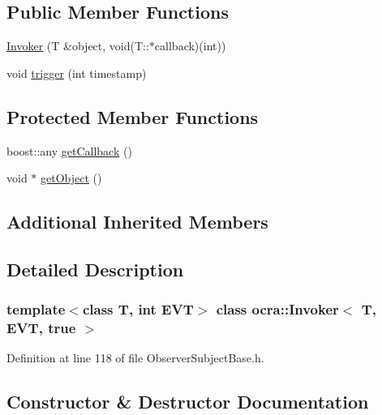 \subsection*{Public Member Functions}
\begin{DoxyCompactItemize}
\item 
\hyperlink{classocra_1_1Invoker_3_01T_00_01EVT_00_01true_01_4_afba0606d59375568cb88fe02023c962e}{Invoker} (T \&object, void(T\+::$\ast$callback)(int))
\item 
void \hyperlink{classocra_1_1Invoker_3_01T_00_01EVT_00_01true_01_4_a9b6283c07e6477a21c4b82b17940d832}{trigger} (int timestamp)
\end{DoxyCompactItemize}
\subsection*{Protected Member Functions}
\begin{DoxyCompactItemize}
\item 
boost\+::any \hyperlink{classocra_1_1Invoker_3_01T_00_01EVT_00_01true_01_4_a902cb0e1084dc60929920a56631c8586}{get\+Callback} ()
\item 
void $\ast$ \hyperlink{classocra_1_1Invoker_3_01T_00_01EVT_00_01true_01_4_ab187a80065f38c9a650e0a5b35185153}{get\+Object} ()
\end{DoxyCompactItemize}
\subsection*{Additional Inherited Members}


\subsection{Detailed Description}
\subsubsection*{template$<$class T, int E\+VT$>$\newline
class ocra\+::\+Invoker$<$ T, E\+V\+T, true $>$}



Definition at line 118 of file Observer\+Subject\+Base.\+h.



\subsection{Constructor \& Destructor Documentation}
\hypertarget{classocra_1_1Invoker_3_01T_00_01EVT_00_01true_01_4_afba0606d59375568cb88fe02023c962e}{}\label{classocra_1_1Invoker_3_01T_00_01EVT_00_01true_01_4_afba0606d59375568cb88fe02023c962e} 
